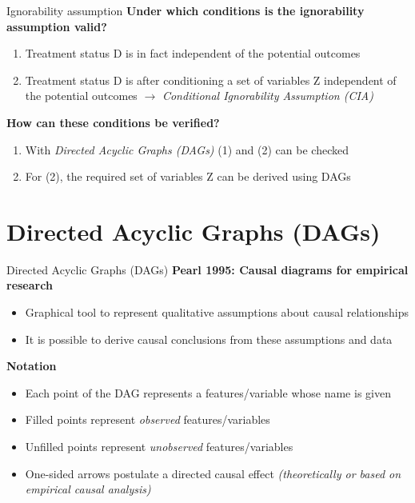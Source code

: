 \documentclass{beamer}\usepackage[]{graphicx}\usepackage[]{xcolor}
\begin{document}
\begin{frame}{Ignorability assumption}
\textbf{Under which conditions is the ignorability assumption valid?}
\begin{enumerate}
  \item Treatment status D is in fact independent of the potential outcomes
  \item Treatment status D is after conditioning a set of variables Z independent of the potential outcomes $\rightarrow$ \textit{Conditional Ignorability Assumption (CIA)}
\end{enumerate}

\textbf{How can these conditions be verified?}
\begin{enumerate}
  \item With \textit{Directed Acyclic Graphs (DAGs)} (1) and (2) can be checked
  \item For (2), the required set of variables Z can be derived using DAGs
\end{enumerate}

\end{frame}


\section{Directed Acyclic Graphs (DAGs)} %

\begin{frame}{Directed Acyclic Graphs (DAGs)}
\textbf{Pearl 1995: Causal diagrams for empirical research}
\begin{itemize}
  \item Graphical tool to represent qualitative assumptions about causal relationships 
  \item It is possible to derive causal conclusions from these assumptions and data
\end{itemize}

\textbf{Notation}
\begin{itemize}
  \item Each point of the DAG represents a features/variable whose name is given
  \item Filled points represent \textit{observed} features/variables
  \item Unfilled points represent \textit{unobserved} features/variables
  \item One-sided arrows postulate a directed causal effect \textit{(theoretically or based on empirical causal analysis)}
\end{itemize}
\end{frame} 
\end{document}
